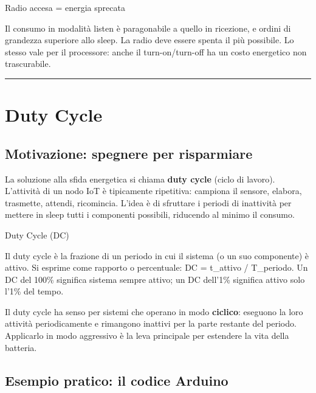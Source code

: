 \documentclass[
  italian,
  openany]{book}
\begin{document}
\begin{calloutwarning}{Radio accesa = energia sprecata}

Il consumo in modalità listen è paragonabile a quello in ricezione, e
ordini di grandezza superiore allo sleep. La radio deve essere spenta il
più possibile. Lo stesso vale per il processore: anche il
turn-on/turn-off ha un costo energetico non trascurabile.

\end{calloutwarning}

\begin{center}\rule{0.5\linewidth}{0.5pt}\end{center}

\section{Duty Cycle}\label{duty-cycle}

\subsection{Motivazione: spegnere per
risparmiare}\label{motivazione-spegnere-per-risparmiare}

La soluzione alla sfida energetica si chiama \textbf{duty cycle} (ciclo
di lavoro). L'attività di un nodo IoT è tipicamente ripetitiva: campiona
il sensore, elabora, trasmette, attendi, ricomincia. L'idea è di
sfruttare i periodi di inattività per mettere in sleep tutti i
componenti possibili, riducendo al minimo il consumo.

\begin{calloutdefinition}{Duty Cycle (DC)}

Il duty cycle è la frazione di un periodo in cui il sistema (o un suo
componente) è attivo. Si esprime come rapporto o percentuale: DC =
t\_attivo / T\_periodo. Un DC del 100\% significa sistema sempre attivo;
un DC dell'1\% significa attivo solo l'1\% del tempo.

\end{calloutdefinition}

Il duty cycle ha senso per sistemi che operano in modo \textbf{ciclico}:
eseguono la loro attività periodicamente e rimangono inattivi per la
parte restante del periodo. Applicarlo in modo aggressivo è la leva
principale per estendere la vita della batteria.

\subsection{Esempio pratico: il codice
Arduino}\label{esempio-pratico-il-codice-arduino}
\end{document}
